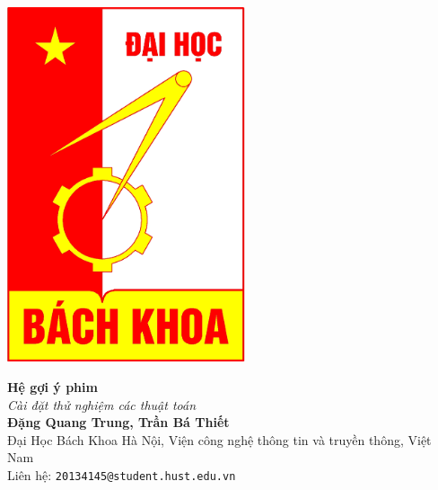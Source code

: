 \documentclass[a0,portrait,11pt]{a0poster}
\begin{document}

\begin{minipage}[b]{0.15\linewidth}
\includegraphics[width=7cm]{hust.jpg}
\end{minipage}
\begin{minipage}[c]{0.73\linewidth}
\begin{center}
\VeryHuge \color{NavyBlue} \textbf{Hệ gợi ý phim} \color{Black}\\ %
\Huge\textit{Cài đặt thử nghiệm các thuật toán }\\[2.0cm] %
\huge \textbf{Đặng Quang Trung, Trần Bá Thiết}\\[0.5cm] %
\huge Đại Học Bách Khoa Hà Nội, Viện công nghệ thông tin và truyền thông, Việt Nam\\[0.4cm] %
\Large Liên hệ: \texttt{20134145@student.hust.edu.vn}\\
\end{center}
\end{minipage}
%
\end{document}
